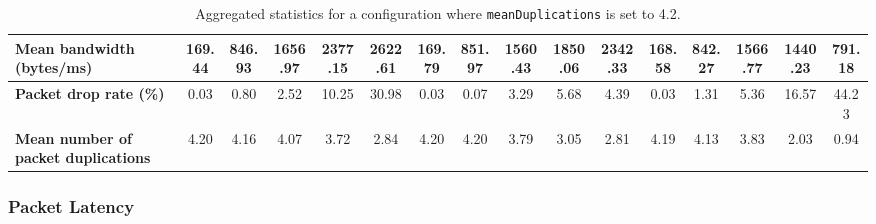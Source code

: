 \begin{table}[!h]
{\begin{tabular}{|l|ccccc|ccccc|ccccc|}
            \\ \hline
            \textbf{Mean bandwidth (bytes/ms)} & \multicolumn{1}{c|}{169.44} & \multicolumn{1}{c|}{846.93}
            & \multicolumn{1}{c|}{1656.97}
            & \multicolumn{1}{c|}{2377.15}
            & \multicolumn{1}{c|}{2622.61}
            & \multicolumn{1}{c|}{169.79}
            & \multicolumn{1}{c|}{851.97}
            & \multicolumn{1}{c|}{1560.43}
            & \multicolumn{1}{c|}{1850.06}
            & \multicolumn{1}{c|}{2342.33}
            & \multicolumn{1}{c|}{168.58}
            & \multicolumn{1}{c|}{842.27}
            & \multicolumn{1}{c|}{1566.77}
            & \multicolumn{1}{c|}{1440.23}
            & \multicolumn{1}{c|}{791.18}
            \\ \hline
            \textbf{Packet drop rate (\%)} & \multicolumn{1}{c|}{0.03} & \multicolumn{1}{c|}{0.80}
            & \multicolumn{1}{c|}{2.52}
            & \multicolumn{1}{c|}{10.25}
            & \multicolumn{1}{c|}{30.98}
            & \multicolumn{1}{c|}{0.03}
            & \multicolumn{1}{c|}{0.07}
            & \multicolumn{1}{c|}{3.29}
            & \multicolumn{1}{c|}{5.68}
            & \multicolumn{1}{c|}{4.39}
            & \multicolumn{1}{c|}{0.03}
            & \multicolumn{1}{c|}{1.31}
            & \multicolumn{1}{c|}{5.36}
            & \multicolumn{1}{c|}{16.57}
            & \multicolumn{1}{c|}{44.23}
            \\ \hline
            \textbf{Mean number of packet duplications} & \multicolumn{1}{c|}{4.20} & \multicolumn{1}{c|}{4.16}
            & \multicolumn{1}{c|}{4.07}
            & \multicolumn{1}{c|}{3.72}
            & \multicolumn{1}{c|}{2.84}
            & \multicolumn{1}{c|}{4.20}
            & \multicolumn{1}{c|}{4.20}
            & \multicolumn{1}{c|}{3.79}
            & \multicolumn{1}{c|}{3.05}
            & \multicolumn{1}{c|}{2.81}
            & \multicolumn{1}{c|}{4.19}
            & \multicolumn{1}{c|}{4.13}
            & \multicolumn{1}{c|}{3.83}
            & \multicolumn{1}{c|}{2.03}
            & \multicolumn{1}{c|}{0.94}
            \\ \hline
        \end{tabular}
    }
    \caption{Aggregated statistics for a configuration where \texttt{meanDuplications} is set to 4.2.}
    \label{table:analysis_results_duplication}
\end{table}

\subsubsection{Packet Latency}\label{subsubsection:latency_analysis}

